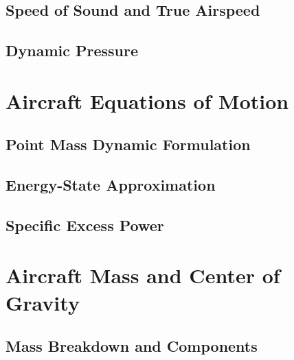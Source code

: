 \documentclass[12pt, a4paper]{report}
\begin{document}
\subsection{Speed of Sound and True Airspeed}
\label{sec:speed_of_sound}


\subsection{Dynamic Pressure}
\label{sec:dynamic_pressure}


\section{Aircraft Equations of Motion}
\label{sec:aircraft_equations_of_motion}


\subsection{Point Mass Dynamic Formulation}
\label{sec:point_mass_dynamic_formulation}


\subsection{Energy-State Approximation}
\label{sec:energy_state_approximation}


\subsection{Specific Excess Power}
\label{sssec:specific_excess_power}


 
\section{Aircraft Mass and Center of Gravity}
\label{sec:aircraft_mass_and_cg}

\subsection{Mass Breakdown and Components}
\label{sec:mass_breakdown_and_components}

\end{document}
